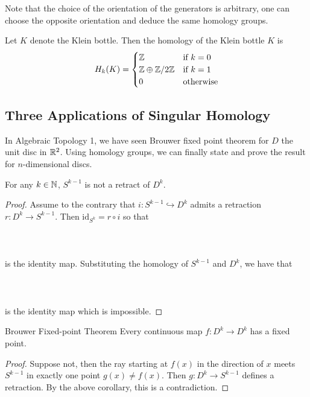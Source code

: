 \documentclass[a4paper]{article}
\begin{document}
Note that the choice of the orientation of the generators is arbitrary, one can choose the opposite orientation and deduce the same homology groups. 

\begin{eg}{}{} Let $K$ denote the Klein bottle. Then the homology of the Klein bottle $K$ is $$H_k(K)=\begin{cases}
\mathbb{Z} & \text{if } k=0\\
\mathbb{Z}\oplus\mathbb{Z}/2\mathbb{Z} & \text{if } k=1\\
0 & \text{otherwise}
\end{cases}$$
\end{eg}

\subsection{Three Applications of Singular Homology}
In Algebraic Topology 1, we have seen Brouwer fixed point theorem for $D$ the unit disc in $\mathbb{R}^2$. Using homology groups, we can finally state and prove the result for $n$-dimensional discs. 

\begin{lmm}{}{} For any $k\in\mathbb{N}$, $S^{k-1}$ is not a retract of $D^k$. \tcbline
\begin{proof}
Assume to the contrary that $i:S^{k-1}\hookrightarrow D^k$ admits a retraction $r:D^k\to S^{k-1}$. Then $\text{id}_{S^k}=r\circ i$ so that \\~\\
\\~\\
is the identity map. Substituting the homology of $S^{k-1}$ and $D^k$, we have that \\~\\
\\~\\
is the identity map which is impossible. 
\end{proof}
\end{lmm}

\begin{thm}{Brouwer Fixed-point Theorem}{} Every continuous map $f:D^k\to D^k$ has a fixed point. \tcbline
\begin{proof}
Suppose not, then the ray starting at $f(x)$ in the direction of $x$ meets $S^{k-1}$ in exactly one point $g(x)\neq f(x)$. Then $g:D^k\to S^{k-1}$ defines a retraction. By the above corollary, this is a contradiction. 
\end{proof}
\end{thm}
\end{document}
